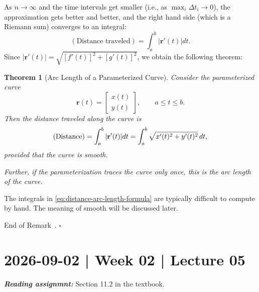 \documentclass[10pt]{article}
\newtheorem{theorem}{Theorem}
\newtheorem{remark}[theorem]{Remark}
\theoremstyle{definition}
\renewenvironment{remark}
{\begin{oldremark}} 
  {\par\smallskip\hfill   End of Remark~\theremark. $\square$    \par\end{oldremark}}
\newcommand{\1}[1]{\textbf{1}_{\left[#1\right]}} %
\begin{document}
As $n \to \infty$ and the time
intervals get smaller (i.e., as $\max_{i}\Delta t_{i}\to 0$), the
approximation gets better and better, and the right hand side (which is a
Riemann sum) converges to an integral:
\begin{equation*}
  (\text{Distance traveled}) = \int_{a}^{b}|\mathbf{r}'(t)|dt.
\end{equation*}
Since $|\mathbf{r}'(t)|  = \sqrt{ \left[ f'(t) \right]^{2}+ \left[ g'(t) \right]^{2}
}$, we obtain the following theorem:

\begin{theorem}[Arc Length of a Parameterized Curve]
  \label{thm:arc-length-parametric-curves}
  Consider the parameterized curve
  \begin{equation*}
    \mathbf{r}(t)=
    \begin{bmatrix}
      x(t)\\y(t)
    \end{bmatrix},\qquad a\leq t\leq b.
  \end{equation*}
  Then the distance traveled along the curve is
  \begin{equation}\label{eq:distance-arc-length-formula}
    ({\rm Distance}) = \int_{a}^{b}|\mathbf{r}'(t)|dt = \int_a^b\sqrt{x'(t)^2+y'(t)^2}\,dt,
  \end{equation}
  provided that the curve is smooth.

  Further, if the parameterization traces the curve only once, this is the
  arc length of the curve.
\end{theorem}

\begin{remark}
  The integrals in \cref{eq:distance-arc-length-formula} are typically
  difficult to compute by hand. The meaning of smooth will be discussed
  later.
\end{remark}
\newpage





\section{2026-09-02 | Week 02 | Lecture 05}
\textit{\textbf{Reading assignmnt:}} Section 11.2 in the textbook.
\end{document}
